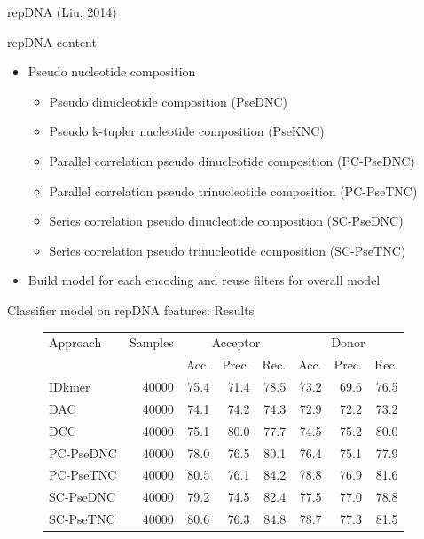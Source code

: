 \documentclass[10pt]{beamer}
\begin{document}
\begin{frame}{repDNA (Liu, 2014)}
	\begin{block}{repDNA content}
		\begin{itemize}
			\item Pseudo nucleotide composition
			\begin{itemize}
				\item Pseudo dinucleotide composition (PseDNC)
				\item Pseudo k-tupler nucleotide composition (PseKNC)
				\item Parallel correlation pseudo dinucleotide composition (PC-PseDNC)
				\item Parallel correlation pseudo trinucleotide composition (PC-PseTNC)
				\item Series correlation pseudo dinucleotide composition (SC-PseDNC)
				\item Series correlation pseudo trinucleotide composition (SC-PseTNC)
			\end{itemize}
		\end{itemize}
	\end{block}
	\pause
	\begin{itemize}
		\item Build model for each encoding and reuse filters for overall model
	\end{itemize}
\end{frame}

\begin{frame}{Classifier model on repDNA features: Results}
	\begin{figure}
		\small
		\centering
		\begingroup
		\def\arraystretch{1.2}
		\begin{tabular}{|l|r|r|r|r|r|r|r|}
			\hline
			Approach  & Samples & \multicolumn{3}{c|}{Acceptor} & \multicolumn{3}{c|}{Donor} \\
			\cline{3-8}
			& & Acc. & Prec. & Rec. & Acc. & Prec. & Rec. \\
			\hline
			IDkmer & 40000 & 75.4 & 71.4 & 78.5 & 73.2 & 69.6 & 76.5 \\
			DAC & 40000 & 74.1 & 74.2 & 74.3 & 72.9 & 72.2 & 73.2 \\
			DCC & 40000 & 75.1 & 80.0 & 77.7 & 74.5 & 75.2 & 80.0 \\
			PC-PseDNC & 40000 & 78.0 & 76.5 & 80.1 & 76.4 & 75.1 & 77.9 \\
			PC-PseTNC & 40000 & 80.5 & 76.1 & 84.2 & 78.8 & 76.9 & 81.6 \\
			SC-PseDNC & 40000 & 79.2 & 74.5 & 82.4 & 77.5 & 77.0 & 78.8 \\
			SC-PseTNC & 40000 & 80.6 & 76.3 & 84.8 & 78.7 & 77.3 & 81.5\\
			
			\hline  
		\end{tabular}
		\endgroup
	\end{figure}
\end{frame}
\end{document}
